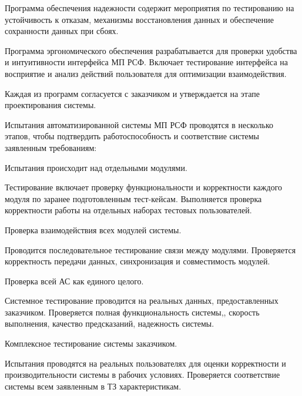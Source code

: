 Программа обеспечения надежности содержит мероприятия
по тестированию на устойчивость к отказам,
механизмы восстановления данных и обеспечение сохранности данных при сбоях.

Программа эргономического обеспечения разрабатывается
для проверки удобства и интуитивности интерфейса МП РСФ.
Включает тестирование интерфейса на восприятие
и анализ действий пользователя для оптимизации взаимодействия.

Каждая из программ согласуется с заказчиком
и утверждается на этапе проектирования системы.



Испытания автоматизированной системы МП РСФ проводятся в несколько этапов,
чтобы подтвердить работоспособность
и соответствие системы заявленным требованиям:


Испытания происходит над отдельными модулями.

Тестирование включает проверку функциональности
и корректности каждого модуля по заранее подготовленным тест-кейсам.
Выполняется проверка корректности работы на отдельных наборах тестовых пользователей.


Проверка взаимодействия всех модулей системы.

Проводится последовательное тестирование связи между модулями.
Проверяется корректность передачи данных, синхронизация
и совместимость модулей.


Проверка всей АС как единого целого.

Системное тестирование проводится на реальных данных,
предоставленных заказчиком.
Проверяется полная функциональность системы,,
скорость выполнения, качество предсказаний, надежность системы.


Комплексное тестирование системы заказчиком.

Испытания проводятся на реальных пользователях для оценки корректности
и производительности системы в рабочих условиях.
Проверяется соответствие системы всем заявленным в ТЗ характеристикам.


